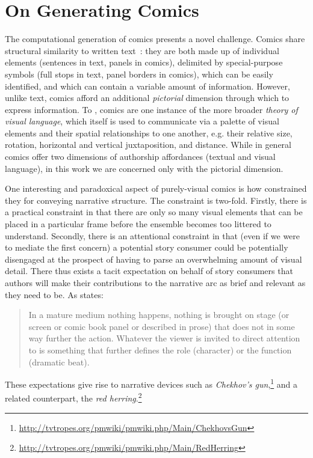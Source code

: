 \section{On Generating Comics}

The computational generation of comics presents a novel challenge. Comics 
share structural similarity to written text~\cite{saraceni2016relatedness}: 
they are both made up of individual elements (sentences in text, panels in 
comics), delimited by special-purpose symbols (full stops in text, panel 
borders in comics), which can be easily identified, and which can contain a 
variable amount of information. However, unlike text, comics afford an additional \emph{pictorial} dimension through which to express information. To 
, comics are one instance of the more broader 
\emph{theory of visual language}, which itself is used to communicate via
a palette of visual elements and their spatial relationships to one another,
e.g. their relative size, rotation, horizontal and vertical juxtaposition, 
and distance. While in general comics offer two dimensions of authorship 
affordances (textual and visual language), in this work we are concerned 
only with the pictorial dimension.

One interesting and paradoxical aspect of purely-visual comics is how
constrained they for conveying narrative structure. The constraint is 
two-fold. Firstly, there is a practical constraint in that there are 
only so many visual elements that can be placed in a particular frame
before the ensemble becomes too littered to understand. Secondly, there
is an attentional constraint in that (even if we were to mediate
the first concern) a potential story consumer could be potentially
disengaged at the prospect of having to parse an overwhelming amount of
visual detail. There thus exists a tacit expectation on behalf of story
consumers that authors will make their contributions to the narrative arc
as brief and relevant as they need to be. As  states:
%
\begin{quote}
	In a mature medium nothing happens, nothing is brought on stage (or 
	screen or comic book panel or described in prose) that does not in
	some way further the action. Whatever the viewer is invited to direct
	attention to is something that further defines the role (character) 
	or the function (dramatic beat).
\end{quote}
%
These expectations give rise to narrative devices such as \emph{Chekhov's gun},\footnote{\url{http://tvtropes.org/pmwiki/pmwiki.php/Main/ChekhovsGun}} and a
related counterpart, the \emph{red herring}.\footnote{\url{http://tvtropes.org/pmwiki/pmwiki.php/Main/RedHerring}}

